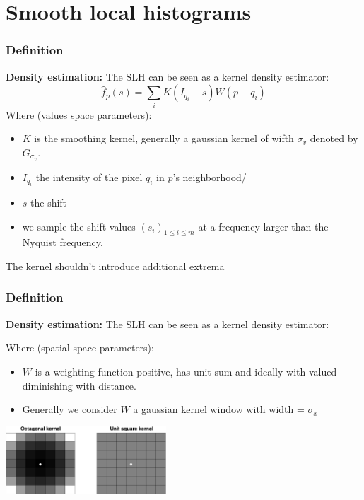 \documentclass [10 pt, xcolor=pdftex,x11names,table]{beamer}
\newcommand{\Gv}{G_{\mathit{\sigma_v}}}
\begin{document}
\section{Smooth local histograms}
\begin{frame}[label=SLH1]
    \frametitle{Definition}
    \textbf{Density estimation:}
    The SLH can be seen as a kernel density estimator:
    \[\hat f_p(s) = \sum_i K(I_{q_i}-s)W(p-q_i)\]
    Where (values space parameters):
    \begin{itemize}
    \item $K$ is the smoothing kernel, generally a gaussian kernel of wifth $\sigma_v$ denoted by $\Gv$.
    \item $I_{q_i}$ the intensity of the pixel $q_i$ in $p$'s neighborhood/
    \item $s$ the shift
    \item we sample the shift values $(s_i)_{1\leq i\leq m}$ at a frequency larger than the Nyquist frequency.
    \end{itemize}

    \begin{center}\framebox{$f_p(s) = \Gv(I_p - s) \otimes W$}\end{center}

    \centerline{\textcolor{black!70}{The kernel shouldn't introduce additional extrema}}
\end{frame}

\begin{frame}[label=SLH2]
    \frametitle{Definition}
    \textbf{Density estimation:}
    The SLH can be seen as a kernel density estimator:
    \begin{center}\framebox{$f_p(s) = \Gv(I_p - s) \otimes W$}\end{center}
    Where (spatial space parameters):
    \begin{itemize}
    \item $W$ is a weighting function positive, has unit sum and ideally with valued diminishing with distance.
    \item Generally we consider $W$ a gaussian kernel window with width = $\sigma_x$ 
    \end{itemize}
        \begin{center}\includegraphics[width=6cm]{kernels}\end{center}

    
\end{frame}
\end{document}
